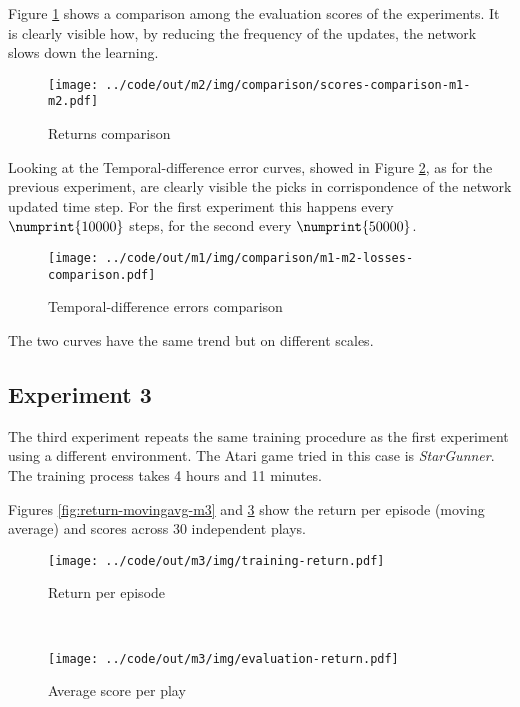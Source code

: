 \documentclass[a4paper,12pt]{article} %
\begin{document}
	Figure \ref{fig:score-m1-m2} shows a comparison among the evaluation scores of the experiments. It is clearly visible how, by reducing the frequency of the updates, the network slows down the learning.
	
	\begin{figure}[H]
		\centering
		\texttt{[image: ../code/out/m2/img/comparison/scores-comparison-m1-m2.pdf]}	
		\caption{Returns comparison}
		\label{fig:score-m1-m2}
	\end{figure}
	
	Looking at the Temporal-difference error curves, showed in Figure \ref{fig:loss-m1-m2}, as for the previous experiment, are clearly visible the picks in corrispondence of the network updated time step. For the first experiment this happens every $\numprint{10000}$ steps, for the second every $\numprint{50000}$.
	
	\begin{figure}[htb]
		\centering
		\texttt{[image: ../code/out/m1/img/comparison/m1-m2-losses-comparison.pdf]}	
		\caption{Temporal-difference errors comparison}
		\label{fig:loss-m1-m2}
	\end{figure}
	
	The two curves have the same trend but on different scales.
	
	\subsection*{Experiment 3}
	The third experiment repeats the same training procedure as the first experiment using a different environment. The Atari game tried in this case is \textit{StarGunner}. The training process takes 4 hours and 11 minutes.
	
	Figures \ref{fig:return-movingavg-m3} and \ref{fig:score-m3} show the return per episode (moving average) and scores across 30 independent plays.
	\begin{figure}[htb]
		\begin{minipage}[b]{.49\textwidth}
			\centering
			\texttt{[image: ../code/out/m3/img/training-return.pdf]}	
			\caption{Return per episode}
			\label{fig:return-movingavg-m3}
		\end{minipage}
		~
		\begin{minipage}[b]{.49\textwidth}
			\centering
			\texttt{[image: ../code/out/m3/img/evaluation-return.pdf]}	
			\caption{Average score per play}
			\label{fig:score-m3}
		\end{minipage}
	\end{figure}
	
\end{document}
